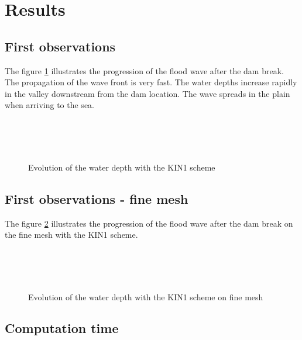 \section{Results}
\subsection{First observations}

The figure \ref{fig:malpasset:WD_cin1} illustrates the progression of the flood wave after the dam break.
The propagation of the wave front is very fast. The water depths increase rapidly in the valley downstream from the dam location. The wave spreads in the plain when arriving to the sea.

\begin{figure}[H]
  \centering
  \\
  \\
  \\
  \caption{Evolution of the water depth with the KIN1 scheme}\label{fig:malpasset:WD_cin1}
\end{figure}

\subsection{First observations - fine mesh}

The figure \ref{fig:malpasset:WD_fine} illustrates the progression of the flood wave after the dam break on the fine mesh
with the KIN1 scheme.
\begin{figure}[H]
  \centering
  \\
  \\
  \\
  \caption{Evolution of the water depth with the KIN1 scheme on fine mesh}\label{fig:malpasset:WD_fine}
\end{figure}

\subsection{Computation time}

